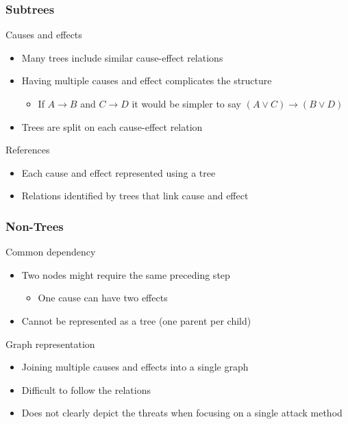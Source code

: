 \begin{frame}\frametitle{Subtrees}
  \begin{block}{Causes and effects}
    \begin{itemize}
      \item Many trees include similar cause-effect relations
      \item Having multiple causes and effect complicates the structure
      \begin{itemize}
        \item If $A \rightarrow B$ and $C \rightarrow D$ it would be simpler to say $(A \vee C) \rightarrow (B \vee D)$
      \end{itemize}
      \item Trees are split on each cause-effect relation
    \end{itemize}
  \end{block}
  \begin{block}{References}
    \begin{itemize}
      \item Each cause and effect represented using a tree
      \item Relations identified by trees that link cause and effect
    \end{itemize}
  \end{block}
\end{frame}



\begin{frame}\frametitle{Non-Trees}
  \begin{block}{Common dependency}
    \begin{itemize}
      \item Two nodes might require the same preceding step
      \begin{itemize}
        \item One cause can have two effects
      \end{itemize}
      \item Cannot be represented as a tree (one parent per child)
    \end{itemize}
  \end{block}
  \begin{block}{Graph representation}
    \begin{itemize}
      \item Joining multiple causes and effects into a single graph
      \item Difficult to follow the relations
      \item Does not clearly depict the threats when focusing on a single attack method
    \end{itemize}
  \end{block}
\end{frame}
